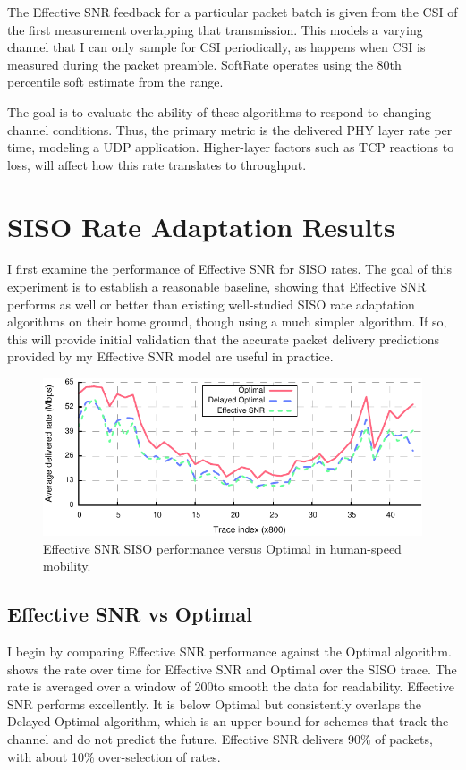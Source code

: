 The Effective SNR feedback for a particular packet batch is given from the CSI of the first measurement overlapping that transmission. This models a varying channel that I can only sample for CSI periodically, as happens when CSI is measured during the packet preamble. SoftRate operates using the 80th percentile soft estimate from the range.

The goal is to evaluate the ability of these algorithms to respond to changing channel conditions. Thus, the primary metric is the delivered PHY layer rate per time, modeling a UDP application. Higher-layer factors such as TCP reactions to loss, will affect how this rate translates to throughput.

\section{SISO Rate Adaptation Results}
I first examine the performance of Effective SNR for SISO rates. The goal of this experiment is to establish a reasonable baseline, showing that Effective SNR performs as well or better than existing well-studied SISO rate adaptation algorithms on their home ground, though using a much simpler algorithm. If so, this will provide initial validation that the accurate packet delivery predictions provided by my Effective SNR model are useful in practice.

\begin{figure}[t]
      \centering
      \includegraphics[width=\textwidth]{figures/rate/siso_rate_time.pdf}
      \caption[Effective SNR SISO performance versus Optimal in human-speed mobility]{\label{fig:siso_rate_time_opt_eff} Effective SNR SISO performance versus Optimal in human-speed mobility.}
\end{figure}

\subsection{Effective SNR vs Optimal}
I begin by comparing Effective SNR performance against the Optimal algorithm.  shows the rate over time for Effective SNR and Optimal over the SISO trace. The rate is averaged over a window of 200\ms to smooth the data for readability. Effective SNR performs excellently. It is below Optimal but consistently overlaps the Delayed Optimal algorithm, which is an upper bound for schemes that track the channel and do not predict the future. Effective SNR delivers 90\% of packets, with about 10\% over-selection of rates.



